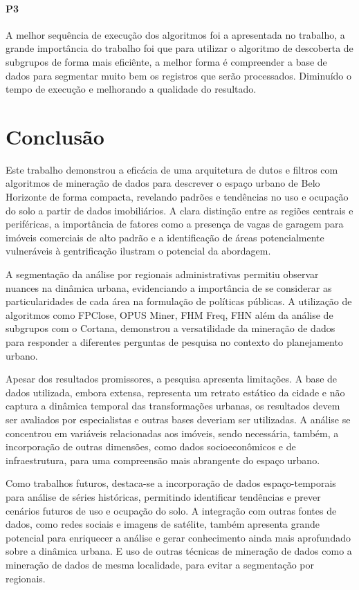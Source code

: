 \documentclass[12pt]{article}
\begin{document}
\paragraph{P3} A melhor sequência de execução dos algoritmos foi a apresentada no trabalho, a grande importância do trabalho foi que para utilizar o algoritmo de descoberta de subgrupos de forma mais eficiênte, a melhor forma é compreender a base de dados para segmentar muito bem os registros que serão processados. Diminuído o tempo de execução e melhorando a qualidade do resultado.

\section{Conclusão}
Este trabalho demonstrou a eficácia de uma arquitetura de dutos e filtros com algoritmos de mineração de dados para descrever o espaço urbano de Belo Horizonte de forma compacta, revelando padrões e tendências no uso e ocupação do solo a partir de dados imobiliários. A clara distinção entre as regiões centrais e periféricas, a importância de fatores como a presença de vagas de garagem para imóveis comerciais de alto padrão e a identificação de áreas potencialmente vulneráveis à gentrificação ilustram o potencial da abordagem.

A segmentação da análise por regionais administrativas permitiu observar nuances na dinâmica urbana, evidenciando a importância de se considerar as particularidades de cada área na formulação de políticas públicas. A utilização de algoritmos como FPClose, OPUS Miner, FHM Freq, FHN além da análise de subgrupos com o Cortana, demonstrou a versatilidade da mineração de dados para responder a diferentes perguntas de pesquisa no contexto do planejamento urbano.

Apesar dos resultados promissores, a pesquisa apresenta limitações. A base de dados utilizada, embora extensa, representa um retrato estático da cidade e não captura a dinâmica temporal das transformações urbanas, os resultados devem ser avaliados por especialistas e outras bases deveriam ser utilizadas. A análise se concentrou em variáveis relacionadas aos imóveis, sendo necessária, também, a incorporação de outras dimensões, como dados socioeconômicos e de infraestrutura, para uma compreensão mais abrangente do espaço urbano.

Como trabalhos futuros, destaca-se a incorporação de dados espaço-temporais para análise de séries históricas, permitindo identificar tendências e prever cenários futuros de uso e ocupação do solo. A integração com outras fontes de dados, como redes sociais e imagens de satélite, também apresenta grande potencial para enriquecer a análise e gerar conhecimento ainda mais aprofundado sobre a dinâmica urbana. E uso de outras técnicas de mineração de dados como a mineração de dados de mesma localidade, para evitar a segmentação por regionais.


\end{document}

